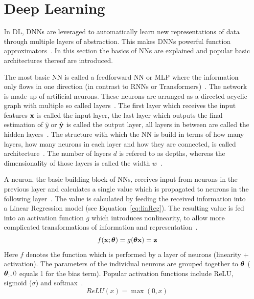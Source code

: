 \section{Deep Learning}
In \ac{DL}, \acp{DNN} are leveraged to automatically learn new representations of data through
multiple layers of abstraction.
This makes \acp{DNN} powerful function approximators~\citep{goodfellow_deep_2016}.
In this section the basics of \acp{NN} are explained and popular basic architectures thereof are
introduced.

The most basic \ac{NN} is called a feedforward \ac{NN} or \ac{MLP} where the information only
flows in one direction (in contrast to \acp{RNN} or Transformers)~\citep{goodfellow_deep_2016}.
The network is made up of artificial neurons.
These neurons are arranged as a directed acyclic graph with multiple so
called layers~\citep{goodfellow_deep_2016}.
The first layer which receives the input features $\textbf{x}$ is called the input layer, the last layer
which outputs the final estimation of $\hat{y}$ or $\hat{\textbf{y}}$ is called the output layer, all layers in between
are called the hidden layers~\citep{shrestha_review_2019}.
The structure with which the \ac{NN} is build in terms of how many layers, how many neurons in each
layer and how they are connected, is called architecture~\citep{goodfellow_deep_2016}.
The number of layers $d$ is refered to as depths, whereas the dimensionality of those layers is
called the width $w$~\citep{goodfellow_deep_2016}.

A neuron, the basic building block of \acp{NN}, receives input from neurons in the previous layer
and calculates a single value which is propagated to neurons in the following
layer~\citep{shrestha_review_2019}.
The value is calculated by feeding the received information into a Linear Regression model (see
Equation~\ref{eq:linReg}).
The resulting value is fed into an activation function $g$ which introduces nonlinearity, to allow
more complicated transformations of information and representation~\citep{goodfellow_deep_2016}.
\begin{equation}\label{eq:neuron}
    f(\textbf{x};\boldsymbol{\theta}) = g(\boldsymbol{\theta}\textbf{x})=\textbf{z}
\end{equation}
Here $f$ denotes the function which is performed by a layer of neurons (linearity + activation).
The parameters of the individual neurons are grouped together to $\boldsymbol{\theta}$ ($\boldsymbol{\theta}_:,0$ equals 1 for the
bias term).
Popular activation functions include ReLU, sigmoid ($\sigma$) and softmax~\citep{shrestha_review_2019}.
\begin{equation}\label{eq:relu}
    ReLU(x)=\max(0,x)
\end{equation}
